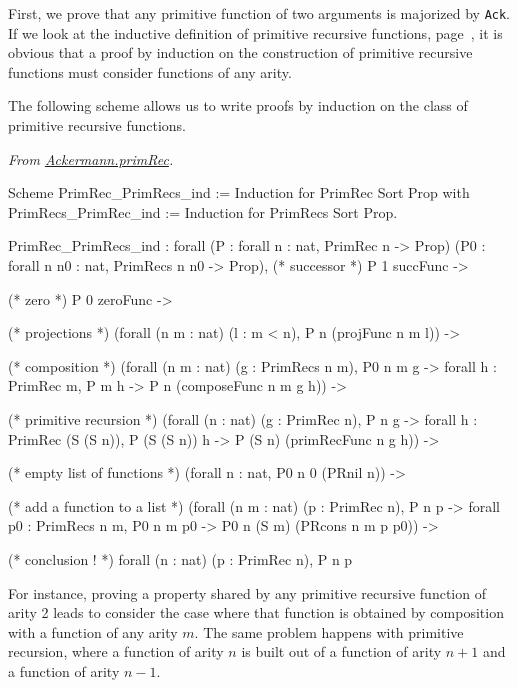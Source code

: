 First, we prove that any primitive function of two arguments is majorized by \texttt{Ack}.
If we look at the inductive definition of primitive recursive functions, page~\pageref{def:Primrec}, it is obvious that a proof by induction on the construction of primitive recursive functions must consider functions of any arity.

The following scheme allows us to write proofs by induction on the class of primitive recursive functions. 

\vspace{4pt}
\noindent
\emph{From \href{../theories/html/hydras.Ackermann.primRec.html}{Ackermann.primRec}.}

\begin{Coqsrc}
Scheme PrimRec_PrimRecs_ind := Induction for PrimRec
  Sort Prop
  with PrimRecs_PrimRec_ind := Induction for PrimRecs 
  Sort Prop.
\end{Coqsrc}

\begin{Coqanswer}
PrimRec_PrimRecs_ind :
forall (P : forall n : nat, PrimRec n -> Prop)
  (P0 : forall n n0 : nat, PrimRecs n n0 -> Prop),
(* successor *)
P 1 succFunc ->

(* zero *)
P 0 zeroFunc ->

(* projections *)
(forall (n m : nat) (l : m < n), P n (projFunc n m l)) ->

(* composition *) 
(forall (n m : nat) (g : PrimRecs n m),
      P0 n m g -> forall h : PrimRec m, P m h -> 
      P n (composeFunc n m g h)) ->

(* primitive recursion *)
(forall (n : nat) (g : PrimRec n),
 P n g ->
    forall h : PrimRec (S (S n)), P (S (S n)) h -> 
     P (S n) (primRecFunc n g h)) ->

(* empty list of functions *)
(forall n : nat, P0 n 0 (PRnil n)) ->

(* add a function to a list *)
(forall (n m : nat) (p : PrimRec n),
   P n p -> 
   forall p0 : PrimRecs n m, P0 n m p0 -> 
   P0 n (S m) (PRcons n m p p0)) ->

(* conclusion ! *)
forall (n : nat) (p : PrimRec n), P n p
\end{Coqanswer}

For instance, proving a property shared by any primitive recursive function of arity 2 leads to consider the case where that function is obtained by composition with a function of any 
arity $m$. The same problem happens with primitive 
recursion, where a function of arity $n$ is built out of a function of arity $n+1$ and a function of arity $n-1$.


